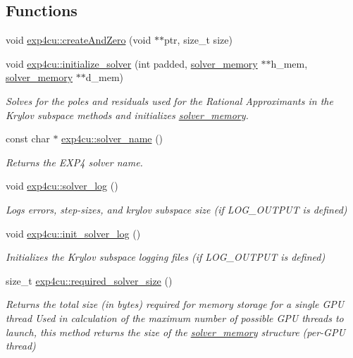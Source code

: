 \subsection*{Functions}
\begin{DoxyCompactItemize}
\item 
void \hyperlink{namespaceexp4cu_abcdabb48b002afcaf4520f85bb06c156}{exp4cu\+::create\+And\+Zero} (void $\ast$$\ast$ptr, size\+\_\+t size)
\item 
void \hyperlink{namespaceexp4cu_aa57e5681ad1b4e46c67d24d12d64e435}{exp4cu\+::initialize\+\_\+solver} (int padded, \hyperlink{structsolver__memory}{solver\+\_\+memory} $\ast$$\ast$h\+\_\+mem, \hyperlink{structsolver__memory}{solver\+\_\+memory} $\ast$$\ast$d\+\_\+mem)
\begin{DoxyCompactList}\small\item\em Solves for the poles and residuals used for the Rational Approximants in the Krylov subspace methods and initializes \hyperlink{structexp4cu_1_1solver__memory}{solver\+\_\+memory}. \end{DoxyCompactList}\item 
const char $\ast$ \hyperlink{namespaceexp4cu_ad9fad26aa869ef1c6b7fc061e1e6abc3}{exp4cu\+::solver\+\_\+name} ()
\begin{DoxyCompactList}\small\item\em Returns the E\+X\+P4 solver name. \end{DoxyCompactList}\item 
void \hyperlink{namespaceexp4cu_a042f555823c136890f60ab28454daf9e}{exp4cu\+::solver\+\_\+log} ()
\begin{DoxyCompactList}\small\item\em Logs errors, step-\/sizes, and krylov subspace size (if L\+O\+G\+\_\+\+O\+U\+T\+P\+UT is defined) \end{DoxyCompactList}\item 
void \hyperlink{namespaceexp4cu_a128b314d7c6b2521bbd64653dc8b9826}{exp4cu\+::init\+\_\+solver\+\_\+log} ()
\begin{DoxyCompactList}\small\item\em Initializes the Krylov subspace logging files (if L\+O\+G\+\_\+\+O\+U\+T\+P\+UT is defined) \end{DoxyCompactList}\item 
size\+\_\+t \hyperlink{namespaceexp4cu_a4d5db66ace53978d01e1975e47e30655}{exp4cu\+::required\+\_\+solver\+\_\+size} ()
\begin{DoxyCompactList}\small\item\em Returns the total size (in bytes) required for memory storage for a single G\+PU thread Used in calculation of the maximum number of possible G\+PU threads to launch, this method returns the size of the \hyperlink{structexp4cu_1_1solver__memory}{solver\+\_\+memory} structure (per-\/\+G\+PU thread) \end{DoxyCompactList}\item 
$$
\end{DoxyCompactItemize}
